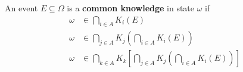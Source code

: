 \documentclass{article}
\begin{document}
   	\begin{definition}
   		An event $E \subseteq \Omega$ is a \textbf{common knowledge} in state $\omega$ if
   		\begin{align}
   			\omega &\in \bigcap_{i \in A} K_i(E) \\
   			\omega &\in \bigcap_{j \in A} K_j \left(\bigcap_{i \in A} K_i(E) \right) \\
   			\omega &\in \bigcap_{k \in A} K_k \left[
	   			\bigcap_{j \in A} K_j \left(\bigcap_{i \in A} K_i(E) \right)
   			\right]
   		\end{align}
   	\end{definition}
\end{document}
